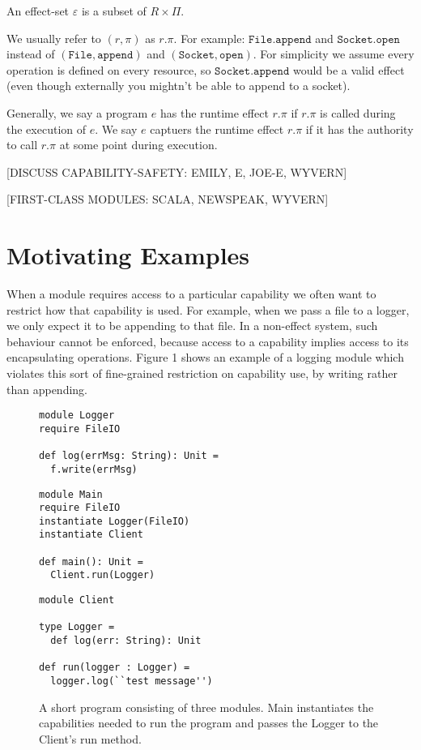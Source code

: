 \documentclass[a4paper,UKenglish]{lipics-v2016}
\newcommand{\kwa}[1]{\mathtt{ #1 }}
\begin{document}
\begin{definition}
An effect-set $\varepsilon$ is a subset of $R \times \Pi$.
\end{definition}

\noindent
We usually refer to $(r, \pi)$ as $r.\pi$. For example: $\kwa{File.append}$ and $\kwa{Socket.open}$ instead of $\kwa{(File, append)}$ and $\kwa{(Socket, open)}$. For simplicity we assume every operation is defined on every resource, so $\kwa{Socket.append}$ would be a valid effect (even though externally you mightn't be able to append to a socket).

Generally, we say a program $e$ has the runtime effect $r.\pi$ if $r.\pi$ is called during the execution of $e$. We say $e$ captuers the runtime effect $r.\pi$ if it has the authority to call $r.\pi$ at some point during execution.

[DISCUSS CAPABILITY-SAFETY: EMILY, E, JOE-E, WYVERN]

[FIRST-CLASS MODULES: SCALA, NEWSPEAK, WYVERN]

\section{Motivating Examples}

When a module requires access to a particular capability we often want to restrict how that capability is used. For example, when we pass a file to a logger, we only expect it to be appending to that file. In a non-effect system, such behaviour cannot be enforced, because access to a capability implies access to its encapsulating operations. Figure 1 shows an example of a logging module which violates this sort of fine-grained restriction on capability use, by writing rather than appending.

\begin{figure}[h]
\vspace{-5pt}
\begin{lstlisting}[mathescape]
module Logger
require FileIO

def log(errMsg: String): Unit =
  f.write(errMsg)
\end{lstlisting}

\begin{lstlisting}
module Main
require FileIO
instantiate Logger(FileIO)
instantiate Client

def main(): Unit =
  Client.run(Logger)
\end{lstlisting}


\begin{lstlisting}
module Client

type Logger =
  def log(err: String): Unit

def run(logger : Logger) =
  logger.log(``test message'')
\end{lstlisting}

\vspace{-7pt}
\caption{A short program consisting of three modules. Main instantiates the capabilities needed to run the program and passes the Logger to the Client's run method. }
\label{f-resource-modules}
\end{figure}
\end{document}
